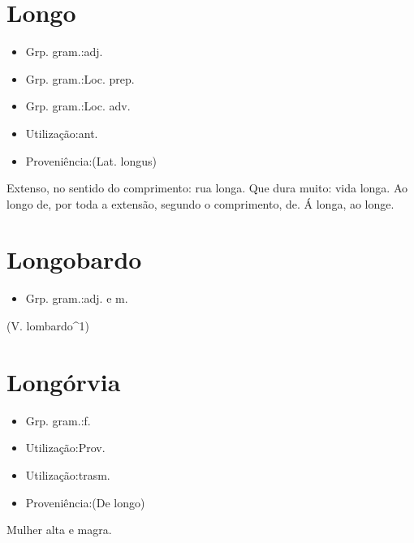 \section{Longo}
\begin{itemize}
\item {Grp. gram.:adj.}
\end{itemize}
\begin{itemize}
\item {Grp. gram.:Loc. prep.}
\end{itemize}
\begin{itemize}
\item {Grp. gram.:Loc. adv.}
\end{itemize}
\begin{itemize}
\item {Utilização:ant.}
\end{itemize}
\begin{itemize}
\item {Proveniência:(Lat. \textunderscore longus\textunderscore )}
\end{itemize}
Extenso, no sentido do comprimento: \textunderscore rua longa\textunderscore .
Que dura muito: \textunderscore vida longa\textunderscore .
\textunderscore Ao longo de\textunderscore , por toda a extensão, segundo o comprimento, de.
\textunderscore Á longa\textunderscore , ao longe.
\section{Longobardo}
\begin{itemize}
\item {Grp. gram.:adj.  e  m.}
\end{itemize}
(V. \textunderscore lombardo\textunderscore ^1)
\section{Longórvia}
\begin{itemize}
\item {Grp. gram.:f.}
\end{itemize}
\begin{itemize}
\item {Utilização:Prov.}
\end{itemize}
\begin{itemize}
\item {Utilização:trasm.}
\end{itemize}
\begin{itemize}
\item {Proveniência:(De \textunderscore longo\textunderscore )}
\end{itemize}
Mulher alta e magra.
